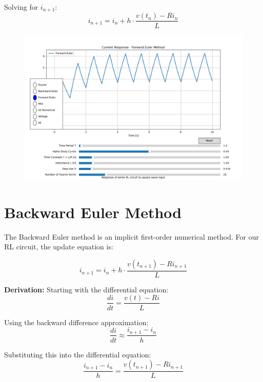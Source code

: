 \documentclass[12pt,a4paper]{report}
\begin{document}
Solving for $i_{n+1}$:
\begin{equation}
i_{n+1} = i_n + h \cdot \frac{v(t_n) - Ri_n}{L}
\end{equation}

\begin{figure}[h!]
	\centering
	\includegraphics[scale=0.5]{figs/ForwardEuler-numerical.png}
\end{figure}



\section{Backward Euler Method}
The Backward Euler method is an implicit first-order numerical method. For our RL circuit, the update equation is:

\begin{equation}
i_{n+1} = i_n + h \cdot \frac{v(t_{n+1}) - Ri_{n+1}}{L}
\end{equation}

\textbf{Derivation:}
Starting with the differential equation:
\begin{equation}
\frac{di}{dt} = \frac{v(t) - Ri}{L}
\end{equation}

Using the backward difference approximation:
\begin{equation}
\frac{di}{dt} \approx \frac{i_{n+1} - i_n}{h}
\end{equation}

Substituting this into the differential equation:
\begin{equation}
\frac{i_{n+1} - i_n}{h} = \frac{v(t_{n+1}) - Ri_{n+1}}{L}
\end{equation}
\end{document}
